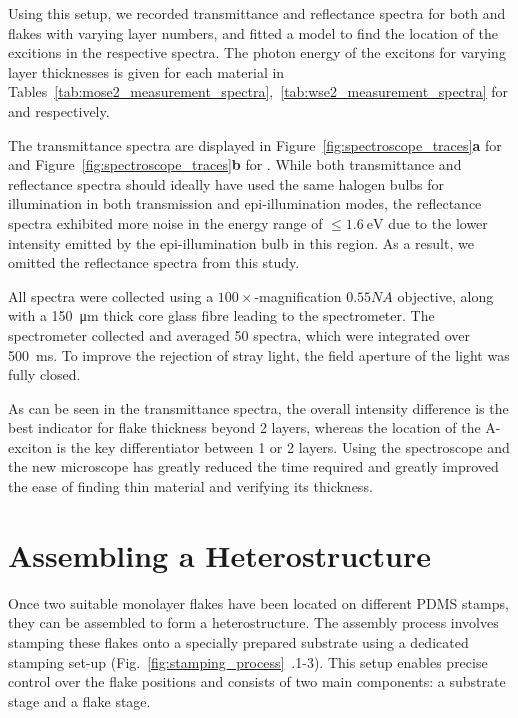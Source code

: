 \vspace{1cm}

Using this setup, we recorded transmittance and reflectance spectra for both  and  flakes with varying layer numbers, and fitted a model to find the location of the excitions in the respective spectra. The photon energy of the excitons for varying layer thicknesses is given for each material in Tables~\ref{tab:mose2_measurement_spectra},~\ref{tab:wse2_measurement_spectra} for  and  respectively.



The transmittance spectra are displayed in Figure~\ref{fig:spectroscope_traces}\textbf{a} for  and Figure~\ref{fig:spectroscope_traces}\textbf{b} for . 
%
While both transmittance and reflectance spectra should ideally have used the same halogen bulbs for illumination in both transmission and epi-illumination modes, the reflectance spectra exhibited more noise in the energy range of $\leq \SI{1.6}{\electronvolt}$ due to the lower intensity emitted by the epi-illumination bulb in this region. As a result, we omitted the reflectance spectra from this study.

All spectra were collected using a $100\times$-magnification $0.55NA$ objective, along with a \SI{150}{\micro\meter} thick core glass fibre leading to the spectrometer. 
%
The spectrometer collected and averaged 50 spectra, which were integrated over \SI{500}{\milli\second}. To improve the rejection of stray light, the field aperture of the light was fully closed.

As can be seen in the transmittance spectra, the overall intensity difference is the best indicator for flake thickness beyond 2 layers, whereas the location of the A-exciton is the key differentiator between 1 or 2 layers. 
%
Using the spectroscope and the new microscope has greatly reduced the time required and greatly improved the ease of finding thin material and verifying its thickness.

\section{Assembling a Heterostructure}
%
Once two suitable monolayer flakes have been located on different PDMS stamps, they can be assembled to form a heterostructure.
%
The assembly process involves stamping these flakes onto a specially prepared substrate using a dedicated stamping set-up (Fig.~\ref{fig:stamping_process}~.1-3).
%
This setup enables precise control over the flake positions and consists of two main components: a substrate stage and a flake stage.

